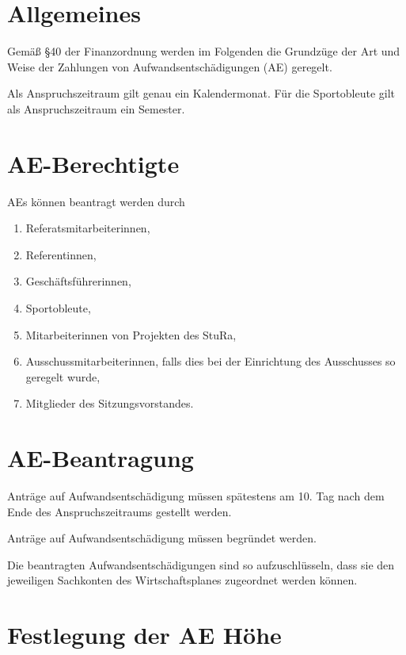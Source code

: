\setcounter{section}{0}
\begin{multicols}{2}


\section{Allgemeines}

\Abs \Satz Gemäß §40 der Finanzordnung werden im Folgenden die Grundzüge der Art und Weise der Zahlungen von Aufwandsentschädigungen (AE) geregelt.

\Abs \Satz Als Anspruchszeitraum gilt genau ein Kalendermonat. Für die Sportobleute gilt als Anspruchszeitraum ein Semester.


\section{AE-Berechtigte}

\Abs \Satz AEs können beantragt werden durch
\begin{enumerate}
\item Referatsmitarbeiterinnen,
\item Referentinnen,
\item Geschäftsführerinnen,
\item Sportobleute,
\item Mitarbeiterinnen von Projekten des StuRa,
\item Ausschussmitarbeiterinnen, falls dies bei der Einrichtung des Ausschusses so geregelt wurde,
\item Mitglieder des Sitzungsvorstandes.
\end{enumerate}


\section{AE-Beantragung}

\Abs \Satz Anträge auf Aufwandsentschädigung müssen spätestens am 10. Tag nach dem Ende des Anspruchszeitraums gestellt werden.

\Abs \Satz Anträge auf Aufwandsentschädigung müssen begründet werden.

\Abs \Satz Die beantragten Aufwandsentschädigungen sind so aufzuschlüsseln, dass sie den jeweiligen Sachkonten des Wirtschaftsplanes zugeordnet werden können.

\section{Festlegung der AE Höhe}


\end{multicols}
